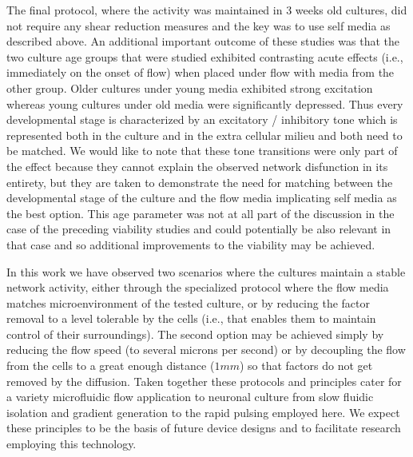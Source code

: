 The final protocol, where the activity was maintained in 3 weeks old cultures, did not require any shear reduction measures and the key was to use self media as described above. An additional important outcome of these studies was that the two culture age groups that were studied exhibited contrasting acute effects (i.e., immediately on the onset of flow) when placed under flow with media from the other group. Older cultures under young media exhibited strong excitation whereas young cultures under old media were significantly depressed. Thus every developmental stage is characterized by an excitatory / inhibitory tone which is represented both in the culture and in the extra cellular milieu and both need to be matched. We would like to note that these tone transitions were only part of the effect because they cannot explain the observed network disfunction in its entirety, but they are taken to demonstrate the need for matching between the developmental stage of the culture and the flow media implicating self media as the best option. This age parameter was not at all part of the discussion in the case of the preceding viability studies and could potentially be also relevant in that case and so additional improvements to the viability may be achieved. 

In this work we have observed two scenarios where the cultures maintain a stable network activity, either through the specialized protocol where the flow media matches microenvironment of the tested culture, or by reducing the factor removal to a level tolerable by the cells (i.e., that enables them to maintain control of their surroundings). The second option may be achieved simply by reducing the flow speed (to several microns per second) or by decoupling the flow from the cells to a great enough distance (\(1mm\)) so that factors do not get removed by the diffusion. Taken together these protocols and principles cater for a variety microfluidic flow application to neuronal culture from slow fluidic isolation and gradient generation to the rapid pulsing employed here. We expect these principles to be the basis of future device designs and to facilitate research employing this technology.

 

